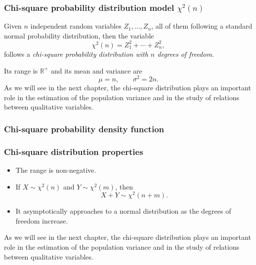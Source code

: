 \begin{frame}
\frametitle{Chi-square probability distribution model $\chi^2(n)$}
\begin{definition}
Given $n$ independent random variables $Z_1,\ldots,Z_n$, all of them following a standard normal probability
distribution, then the variable
\[
\chi^2(n) = Z_1^2+\cdots +Z_n^2,
\]
follows a \emph{chi-square probability distribution with $n$ degrees of freedom}.
\end{definition}

Its range is $\mathbb{R}^+$ and its mean and variance are
\[
\mu = n, \qquad \sigma^2 = 2n.
\]
As we will see in the next chapter, the chi-square distribution plays an important role in the estimation of the
population variance and in the study of relations between qualitative variables.
\end{frame}


\begin{frame}
\frametitle{Chi-square probability density function}

\begin{center}
\end{center}
\end{frame}


\begin{frame}
\frametitle{Chi-square distribution properties}
\begin{itemize}
\item The range is non-negative.
\item If $X\sim \chi^2(n)$ and $Y\sim \chi^2(m)$, then
\[
X+Y \sim \chi^2(n+m).
\]
\item It asymptotically approaches to a normal distribution as the degrees of freedom increase. 
\end{itemize}
As we will see in the next chapter, the chi-square distribution plays an important role in the estimation of the population variance and in the study of relations between qualitative variables.
\end{frame}


